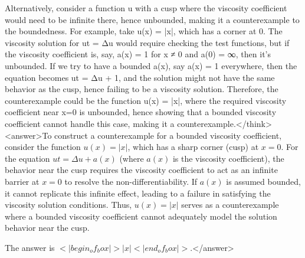 Alternatively, consider a function u with a cusp where the viscosity coefficient would need to be infinite there, hence unbounded, making it a counterexample to the boundedness. For example, take u(x) = |x|, which has a corner at 0. The viscosity solution for ut = Δu would require checking the test functions, but if the viscosity coefficient is, say, a(x) = 1 for x ≠ 0 and a(0) = ∞, then it's unbounded. If we try to have a bounded a(x), say a(x) = 1 everywhere, then the equation becomes ut = Δu + 1, and the solution might not have the same behavior as the cusp, hence failing to be a viscosity solution. Therefore, the counterexample could be the function u(x) = |x|, where the required viscosity coefficient near x=0 is unbounded, hence showing that a bounded viscosity coefficient cannot handle this case, making it a counterexample.</think><answer>To construct a counterexample for a bounded viscosity coefficient, consider the function \( u(x) = |x| \), which has a sharp corner (cusp) at \( x = 0 \). For the equation \( ut = \Delta u + a(x) \) (where \( a(x) \) is the viscosity coefficient), the behavior near the cusp requires the viscosity coefficient to act as an infinite barrier at \( x = 0 \) to resolve the non-differentiability. If \( a(x) \) is assumed bounded, it cannot replicate this infinite effect, leading to a failure in satisfying the viscosity solution conditions. Thus, \( u(x) = |x| \) serves as a counterexample where a bounded viscosity coefficient cannot adequately model the solution behavior near the cusp.  

The answer is \(<|begin_of_box|>|x|<|end_of_box|>\).</answer>